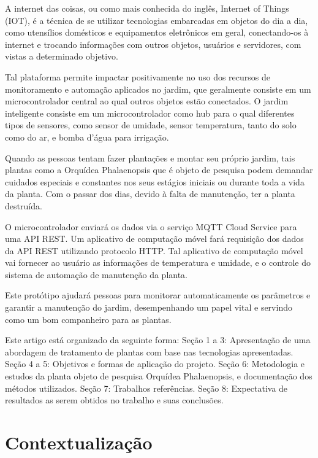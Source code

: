 \documentclass[conference]{IEEEtran}
\begin{document}
A internet das coisas, ou como mais conhecida do inglês, Internet of Things (IOT), é a técnica de se utilizar tecnologias embarcadas em objetos do dia a dia, como utensílios domésticos e equipamentos eletrônicos em geral, conectando-os à internet e trocando informações com outros objetos, usuários e servidores, com vistas a determinado objetivo.

Tal plataforma permite impactar positivamente no uso dos recursos de monitoramento e automação aplicados no jardim, que geralmente consiste em um microcontrolador central ao qual outros objetos estão conectados. O jardim inteligente consiste em um microcontrolador como hub para o qual diferentes tipos de sensores, como sensor de umidade, sensor temperatura, tanto do solo como do ar, e bomba d’água para irrigação.

Quando as pessoas tentam fazer plantações e montar seu próprio jardim, tais plantas como a Orquídea Phalaenopsis que é objeto de pesquisa podem demandar cuidados especiais e constantes nos seus estágios iniciais ou durante toda a vida da planta. Com o passar dos dias, devido à falta de manutenção, ter a planta destruída.

O microcontrolador enviará os dados via o serviço MQTT Cloud Service para uma API REST. Um aplicativo de computação móvel fará requisição dos dados da API REST utilizando protocolo HTTP. Tal aplicativo de computação móvel vai fornecer ao usuário as informações de temperatura e umidade, e o controle do sistema de automação de manutenção da planta.

Este protótipo ajudará pessoas para monitorar automaticamente os parâmetros e garantir a manutenção do jardim, desempenhando um papel vital e servindo como um bom companheiro para as plantas.

Este artigo está organizado da seguinte forma: Seção 1 a 3: Apresentação de uma abordagem de tratamento de plantas com base nas tecnologias apresentadas. Seção 4 a 5: Objetivos e formas de aplicação do projeto. Seção 6: Metodologia e estudos da planta objeto de pesquisa Orquídea Phalaenopsis, e documentação dos métodos utilizados. Seção 7: Trabalhos referências. Seção 8: Expectativa de resultados as serem obtidos no trabalho e suas conclusões.


\section{Contextualização}
\end{document}
